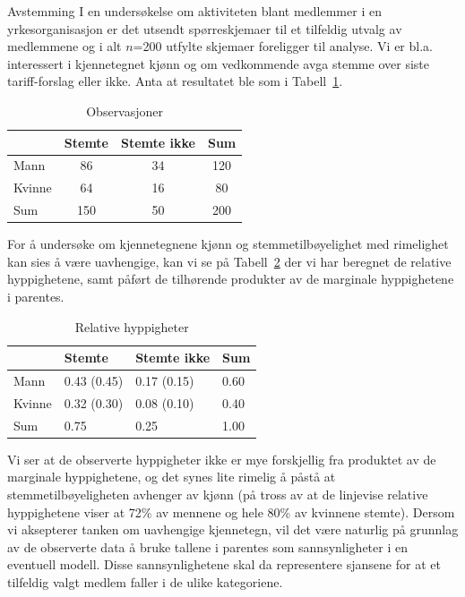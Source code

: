\begin{eksempel}{Avstemming}
I en undersøkelse om aktiviteten blant medlemmer i en yrkesorganisasjon
er det utsendt spørreskjemaer til et tilfeldig utvalg av medlemmene
og i alt $n$=200 utfylte skjemaer foreligger til analyse.  Vi er bl.a.
interessert i kjennetegnet kjønn og om vedkommende avga stemme over siste
tariff-forslag eller ikke.  Anta at resultatet ble som i Tabell~\ref{tab:observasjoner2}.

\begin{table}[h] \centering 
\begin{tabular}{l|cc|c}
       & Stemte & Stemte ikke & Sum  \\ \hline
Mann   &    86  &  34         & 120   \\
Kvinne &    64  &  16         &  80   \\ \hline
Sum    &   150  &  50         & 200   \\ \hline
\end{tabular}
\caption{Observasjoner}
\label{tab:observasjoner2} %
\end{table}

For å undersøke om kjennetegnene kjønn og stemmetilbøyelighet
med rimelighet kan sies å være uavhengige, kan vi se på
Tabell~\ref{tab:rel_hyppigheter2}  der vi har beregnet de relative hyppighetene, samt
påført de tilhørende produkter av de marginale hyppighetene i
parentes.

\begin{table}[h] \centering 
\begin{tabular}{l|ll|l}
       & Stemte       & Stemte ikke  & Sum  \\ \hline
Mann   &  0.43 (0.45) &  0.17 (0.15) & 0.60   \\
Kvinne &  0.32 (0.30) &  0.08 (0.10) & 0.40  \\ \hline
Sum    &  0.75        &  0.25        & 1.00   \\ \hline
\end{tabular}
\caption{Relative hyppigheter}
\label{tab:rel_hyppigheter2} %
\end{table}
Vi ser at de observerte hyppigheter ikke er mye forskjellig fra produktet
av de marginale hyppighetene, og det synes lite rimelig å påstå
at stemmetilbøyeligheten avhenger av kjønn (på tross av at de
linjevise relative hyppighetene viser at 72\% av mennene og hele 80\%
av kvinnene stemte).  Dersom vi aksepterer tanken om uavhengige kjennetegn,
vil det være naturlig på grunnlag av de observerte data å
bruke tallene i parentes som sannsynligheter i en eventuell modell.
Disse sannsynlighetene skal da representere sjansene for at et tilfeldig
valgt medlem faller i de ulike kategoriene.
\end{eksempel}


